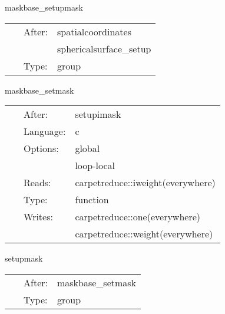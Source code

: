 \hspace{5mm} maskbase\_setupmask 

\hspace{5mm}{\it set up the weight function } 


\hspace{5mm}

 \begin{tabular*}{160mm}{cll} 
~ & After:  & spatialcoordinates \\ 
~& ~ &sphericalsurface\_setup\\ 
~ & Type:  & group \\ 
\end{tabular*} 


\vspace{5mm}


\hspace{5mm} maskbase\_setmask 

\hspace{5mm}{\it set the weight function } 


\hspace{5mm}

 \begin{tabular*}{160mm}{cll} 
~ & After:  & setupimask \\ 
~ & Language:  & c \\ 
~ & Options:  & global \\ 
~& ~ &loop-local\\ 
~ & Reads:  & carpetreduce::iweight(everywhere) \\ 
~ & Type:  & function \\ 
~ & Writes:  & carpetreduce::one(everywhere) \\ 
~& ~ &carpetreduce::weight(everywhere)\\ 
\end{tabular*} 


\vspace{5mm}


\hspace{5mm} setupmask 

\hspace{5mm}{\it set up the real weight function (schedule other routines in here) } 


\hspace{5mm}

 \begin{tabular*}{160mm}{cll} 
~ & After:  & maskbase\_setmask \\ 
~ & Type:  & group \\ 
\end{tabular*} 


